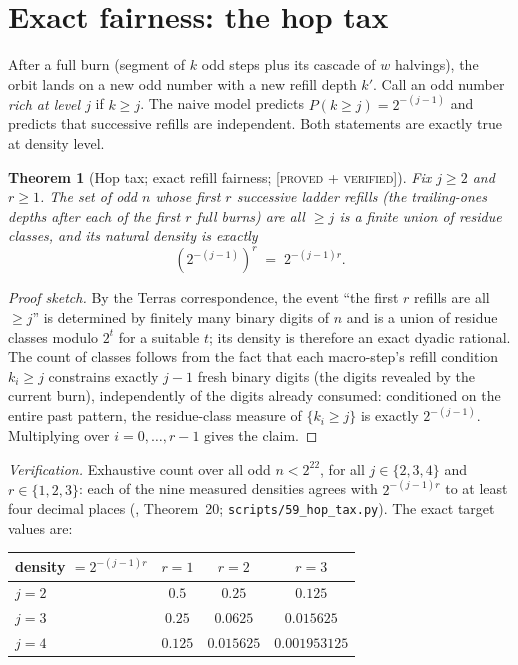 \documentclass[11pt]{article}
\newtheorem{theorem}{Theorem}[section]
\theoremstyle{definition}
\newcommand{\PROVEDVER}{\textup{[\textsc{proved + verified}]}}
\begin{document}
\section{Exact fairness: the hop tax}\label{sec:fair}

After a full burn (segment of $k$ odd steps plus its cascade of $w$ halvings), the orbit
lands on a new odd number with a new refill depth $k'$. Call an odd number \emph{rich at
level $j$} if $k \geq j$. The naive model predicts
$P(k \geq j) = 2^{-(j-1)}$ and predicts that successive refills are independent. Both
statements are exactly true at density level.

\begin{theorem}[Hop tax; exact refill fairness; \PROVEDVER]\label{thm:hoptax}
Fix $j \geq 2$ and $r \geq 1$. The set of odd $n$ whose first $r$ successive ladder
refills (the trailing-ones depths after each of the first $r$ full burns) are all
$\geq j$ is a finite union of residue classes, and its natural density is exactly
\[
\left(2^{-(j-1)}\right)^{r} \;=\; 2^{-(j-1)r}.
\]
\end{theorem}

\begin{proof}[Proof sketch]
By the Terras correspondence, the event ``the first $r$ refills are all $\geq j$''
is determined by finitely many binary digits of $n$ and is a union of residue classes
modulo $2^t$ for a suitable $t$; its density is therefore an exact dyadic rational. The
count of classes follows from the fact that each macro-step's refill condition
$k_i \geq j$ constrains exactly $j - 1$ fresh binary digits (the digits revealed by the
current burn), independently of the digits already consumed: conditioned on the entire
past pattern, the residue-class measure of $\{k_i \geq j\}$ is exactly $2^{-(j-1)}$.
Multiplying over $i = 0, \dots, r-1$ gives the claim.
\end{proof}

\emph{Verification.} Exhaustive count over all odd $n < 2^{22}$, for all
$j \in \{2, 3, 4\}$ and $r \in \{1, 2, 3\}$: each of the nine measured densities agrees
with $2^{-(j-1)r}$ to at least four decimal places
(\cite{Note2026}, Theorem~20; \texttt{scripts/59\_hop\_tax.py}). The exact target
values are:

\begin{center}
\begin{tabular}{lccc}
\toprule
density $= 2^{-(j-1)r}$ & $r = 1$ & $r = 2$ & $r = 3$ \\
\midrule
$j = 2$ & $0.5$    & $0.25$      & $0.125$ \\
$j = 3$ & $0.25$   & $0.0625$    & $0.015625$ \\
$j = 4$ & $0.125$  & $0.015625$  & $0.001953125$ \\
\bottomrule
\end{tabular}
\end{center}
\end{document}
